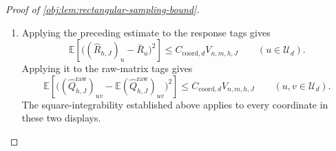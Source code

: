 \begin{proof}[Proof of \cref{obj:lem:rectangular-sampling-bound}]
\begin{enumerate}
By the definition of \(C_{\mathrm{ker},d}\),
\[
M_d^4D_d^2\le C_{\mathrm{ker},d},
\qquad
M_d^4\le C_{\mathrm{ker},d}.
\]
The slice and kernel bounds thus give
\[
\begin{aligned}
\mathbb E(\widehat H_\diamond-\mu_\diamond)^2
&\le \frac{5C_{\mathrm{ker},d}}{nh^d}
     +\frac{6C_{\mathrm{ker},d}k}{nNh^{2d}}\\
&\le6C_{\mathrm{ker},d}V_{n,m,h,J}.
\end{aligned}
\]
The independent-sample mean identity also gives
\[
\mathbb E\widehat S_\diamond
=\mathbb E\!\left[w_h(X^L)f_{\diamond,0}(Z)\right],
\qquad
\mathbb E\widehat H_\diamond=\mu_\diamond,
\]
and
\[
\begin{aligned}
\mathbb E(\widehat S_\diamond-\mathbb E\widehat S_\diamond)^2
&=\frac1\ell
 \left\{
 \mathbb E\!\left[
   \bigl(w_h(X^L)f_{\diamond,0}(Z)\bigr)^2
 \right]
 -\left(\mathbb E[w_h(X^L)f_{\diamond,0}(Z)]\right)^2
 \right\}\\
&\le\frac{3M_d^2}{nh^d}.
\end{aligned}
\]
Linearity of expectation gives the centered-difference identity
\[
F_\diamond-\mathbb EF_\diamond
=(\widehat S_\diamond-\mathbb E\widehat S_\diamond)
 -(\widehat H_\diamond-\mu_\diamond).
\]
The pointwise inequality
\[
(\xi_{\mathrm{diff}}-\zeta_{\mathrm{diff}})^2
\le2\xi_{\mathrm{diff}}^2+2\zeta_{\mathrm{diff}}^2
\qquad(\xi_{\mathrm{diff}},\zeta_{\mathrm{diff}}\in\mathbb R)
\]
follows from \((\xi_{\mathrm{diff}}+\zeta_{\mathrm{diff}})^2\ge0\). Applying it to the centered difference yields
\[
\begin{aligned}
\mathbb E(F_\diamond-\mathbb EF_\diamond)^2
&\le\frac{6M_d^2}{nh^d}
  +12C_{\mathrm{ker},d}V_{n,m,h,J}\\
&\le C_{\mathrm{coord},d}V_{n,m,h,J},
\end{aligned}
\]
because \(1/(nh^d)\le V_{n,m,h,J}\). This argument accommodates the shared outcome records in the two terms.

\item Applying the preceding estimate to the response tags gives
\[
\mathbb E\left[
 \bigl((\widehat R_{h,J})_u-\bar R_u\bigr)^2
 \right]
\le C_{\mathrm{coord},d}V_{n,m,h,J}
\qquad(u\in\mathcal U_d).
\]
Applying it to the raw-matrix tags gives
\[
\mathbb E\left[
 \bigl((\widehat Q^{\mathrm{raw}}_{h,J})_{uv}
       -\mathbb E(\widehat Q^{\mathrm{raw}}_{h,J})_{uv}\bigr)^2
 \right]
\le C_{\mathrm{coord},d}V_{n,m,h,J}
\qquad(u,v\in\mathcal U_d).
\]
The square-integrability established above applies to every coordinate in these two displays.


\end{enumerate}
\end{proof}
